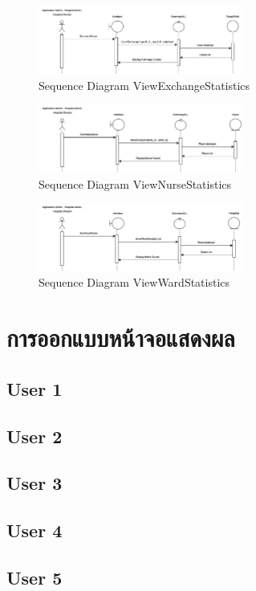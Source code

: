     \begin{figure}[h]
    \centering
    \includegraphics[width=0.6\textwidth]{Sequence 11.5.png}
    \caption{Sequence Diagram ViewExchangeStatistics}
    \end{figure}

    \begin{figure}[h]
    \centering
    \includegraphics[width=0.6\textwidth]{Sequence 11.6.png}
    \caption{Sequence Diagram ViewNurseStatistics}
    \end{figure}

    \begin{figure}[h]
    \centering
    \includegraphics[width=0.6\textwidth]{Sequence 11.7.png}
    \caption{Sequence Diagram ViewWardStatistics}
    \end{figure}





\section{การออกแบบหน้าจอแสดงผล}

\subsection{User 1}

\subsection{User 2}

\subsection{User 3}

\subsection{User 4}

\subsection{User 5}

